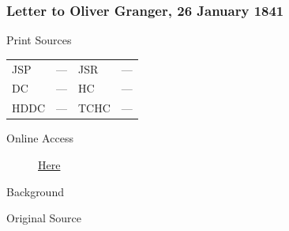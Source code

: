 		\subsubsection{Letter to Oliver Granger, 26 January 1841}
			\label{EMS-1841-JS-26-JAN-1841}
			
			\begin{description}
				\item[Print Sources]
			\end{description}

			\begin{tabular}{p{0.5in}p{1in}p{0.5in}p{1in}}
				JSP	 	& ---		& JSR 		& --- \\
				DC	 	& ---		& HC 		& --- \\
				HDDC 	& ---		& TCHC 		& --- \\
			\end{tabular}
			
			\begin{description}
				\item[Online Access] \href{https://www.josephsmithpapers.org/paper-summary/letter-to-oliver-granger-26-january-1841/1}{Here}
			\end{description}
			
			\begin{description}
				\item[Background]
			\end{description}
			
			
			\begin{description}
				\item[Original Source]
			\end{description}
			
			
